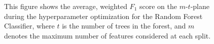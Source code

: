 \begin{figure}[H]
\hfill
{}
\caption[Hyperparameter optimization for the Random Forest Classifier]{This figure shows the average, weighted $F_1$ score on the $m$-$t$-plane during the hyperparameter optimization for the Random Forest Classifier, where $t$ is the number of trees in the forest, and $m$ denotes the maximum number of features considered at each split.}
\label{fig:gridsearch-rf-superclasses}
\end{figure}


